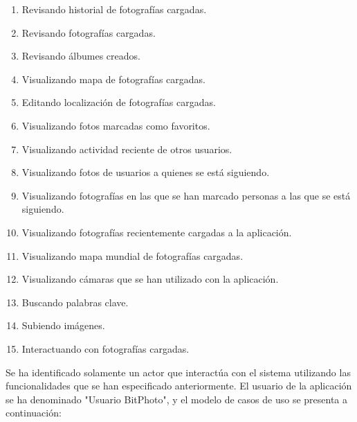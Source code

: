 \documentclass{memoria}
\begin{document}
\begin{enumerate}
    \item Revisando historial de fotografías cargadas.
    \item Revisando fotografías cargadas.
    \item Revisando álbumes creados.
    \item Visualizando mapa de fotografías cargadas.
    \item Editando localización de fotografías cargadas.
    \item Visualizando fotos marcadas como favoritos.
    \item Visualizando actividad reciente de otros usuarios.
    \item Visualizando fotos de usuarios a quienes se está siguiendo.
    \item Visualizando fotografías en las que se han marcado personas a las que se está siguiendo.
    \item Visualizando fotografías recientemente cargadas a la aplicación.
    \item Visualizando mapa mundial de fotografías cargadas.
    \item Visualizando cámaras que se han utilizado con la aplicación.
    \item Buscando palabras clave.
    \item Subiendo imágenes.
    \item Interactuando con fotografías cargadas.
\end{enumerate}
\newpage


Se ha identificado solamente un actor que interactúa con el sistema utilizando las funcionalidades que se han especificado anteriormente. El usuario de la aplicación se ha denominado "Usuario BitPhoto", y el modelo de casos de uso se presenta a continuación:\\

\end{document}
